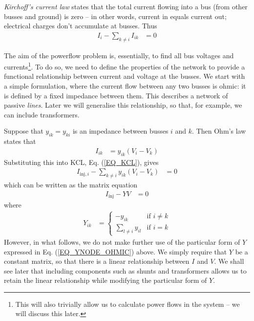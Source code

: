\documentclass[11pt]{article}
\begin{document}
\emph{Kirchoff's current law} states that the total current flowing into a bus (from other busses and ground) is zero -- in other words, current in equals current out; electrical charges don't accumulate at busses. Thus
\begin{align}
	I_{i} - \sum_{k \ne i}{I_{ik}} &= 0
	\label{EQ_KCL}
\end{align}

The aim of the powerflow problem is, essentially, to find all bus voltages and currents\footnote{This will also trivially allow us to calculate power flows in the system -- we will discuss this later.}. To do so, we need to define the properties of the network to provide a functional relationship between current and voltage at the busses. We start with a simple formulation, where the current flow between any two busses is ohmic: it is defined by a fixed impedance between them. This describes a network of passive \emph{lines}. Later we will generalise this relationship, so that, for example, we can include transformers.

Suppose that $y_{ik} = y_{ki}$ is an impedance between busses $i$ and $k$. Then Ohm's law states that
\begin{align}
	I_{ik} &= y_{ik}(V_i - V_k)
\end{align}
Substituting this into KCL, Eq. (\ref{EQ_KCL}), gives
\begin{align}
	I_{\text{inj},i} - \sum_{k \ne i}{y_{ik}(V_i - V_k)} &= 0
	\label{EQ_PF_1}
\end{align}
which can be written as the matrix equation
\begin{align}
	I_\text{inj} - YV &= 0
\end{align}
where
\begin{align}
	Y_{ik} &=
		\begin{cases}
			-y_{ik}&\text{if $i \ne k$} \\
			\sum_{l \ne i} y_{il}& \text{if $i = k$}
		\end{cases}
	\label{EQ_YNODE_OHMIC}
\end{align}
However, in what follows, we do not make further use of the particular form of $Y$ expressed in Eq. (\ref{EQ_YNODE_OHMIC}) above. We simply require that $Y$ be a constant matrix, so that there is a linear relationship between $I$ and $V$. We shall see later that including components such as shunts and transformers allows us to retain the linear relationship while modifying the particular form of $Y$.
\end{document}
